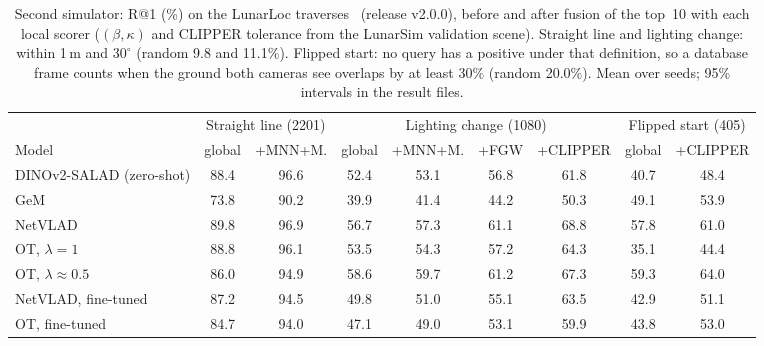 \begin{table}[t]
\centering
\footnotesize
\setlength{\tabcolsep}{4pt}
\caption{Second simulator: R@1 (\%) on the LunarLoc traverses~\cite{thomas2026lunarloc} (release v2.0.0), before and after fusion of the top~10 with each local scorer ($(\beta,\kappa)$ and CLIPPER tolerance from the LunarSim validation scene). Straight line and lighting change: within 1\,m and $30^\circ$ (random 9.8 and 11.1\%). Flipped start: no query has a positive under that definition, so a database frame counts when the ground both cameras see overlaps by at least $30\%$ (random 20.0\%). Mean over seeds; 95\% intervals in the result files.}
\label{tab:lunarloc}
\begin{tabular}{@{}lcccccccc@{}}
\toprule
 & \multicolumn{2}{c}{Straight line (2201)} & \multicolumn{4}{c}{Lighting change (1080)} & \multicolumn{2}{c}{Flipped start (405)} \\
\cmidrule(lr){2-3}\cmidrule(lr){4-7}\cmidrule(lr){8-9}
Model & global & +MNN+M. & global & +MNN+M. & +FGW & +CLIPPER & global & +CLIPPER \\
\midrule
DINOv2-SALAD (zero-shot) & 88.4 & 96.6 & 52.4 & 53.1 & 56.8 & 61.8 & 40.7 & 48.4 \\
GeM & 73.8 & 90.2 & 39.9 & 41.4 & 44.2 & 50.3 & 49.1 & 53.9 \\
NetVLAD & 89.8 & 96.9 & 56.7 & 57.3 & 61.1 & 68.8 & 57.8 & 61.0 \\
OT, $\lambda=1$ & 88.8 & 96.1 & 53.5 & 54.3 & 57.2 & 64.3 & 35.1 & 44.4 \\
OT, $\lambda\approx0.5$ & 86.0 & 94.9 & 58.6 & 59.7 & 61.2 & 67.3 & 59.3 & 64.0 \\
NetVLAD, fine-tuned & 87.2 & 94.5 & 49.8 & 51.0 & 55.1 & 63.5 & 42.9 & 51.1 \\
OT, fine-tuned & 84.7 & 94.0 & 47.1 & 49.0 & 53.1 & 59.9 & 43.8 & 53.0 \\
\bottomrule
\end{tabular}
\end{table}

